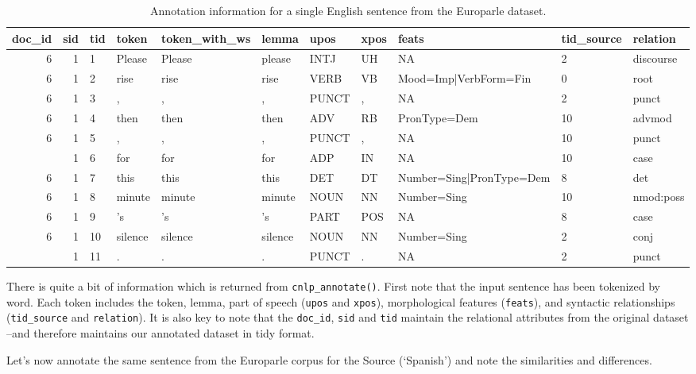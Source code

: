\documentclass[
  letterpaper,
]{latex/krantz}
\begin{document}
\hypertarget{tbl-td-generation-test-annotation-english}{}
\begin{table}
\caption{\label{tbl-td-generation-test-annotation-english}Annotation information for a single English sentence from the Europarle
dataset. }\tabularnewline

\centering
\begin{tabular}{rrlllllllll}
\toprule
doc\_id & sid & tid & token & token\_with\_ws & lemma & upos & xpos & feats & tid\_source & relation\\
\midrule
6 & 1 & 1 & Please & Please & please & INTJ & UH & NA & 2 & discourse\\
6 & 1 & 2 & rise & rise & rise & VERB & VB & Mood=Imp|VerbForm=Fin & 0 & root\\
6 & 1 & 3 & , & , & , & PUNCT & , & NA & 2 & punct\\
6 & 1 & 4 & then & then & then & ADV & RB & PronType=Dem & 10 & advmod\\
6 & 1 & 5 & , & , & , & PUNCT & , & NA & 10 & punct\\
\addlinespace
6 & 1 & 6 & for & for & for & ADP & IN & NA & 10 & case\\
6 & 1 & 7 & this & this & this & DET & DT & Number=Sing|PronType=Dem & 8 & det\\
6 & 1 & 8 & minute & minute & minute & NOUN & NN & Number=Sing & 10 & nmod:poss\\
6 & 1 & 9 & 's & 's & 's & PART & POS & NA & 8 & case\\
6 & 1 & 10 & silence & silence & silence & NOUN & NN & Number=Sing & 2 & conj\\
\addlinespace
6 & 1 & 11 & . & . & . & PUNCT & . & NA & 2 & punct\\
\bottomrule
\end{tabular}
\end{table}

There is quite a bit of information which is returned from
\texttt{cnlp\_annotate()}. First note that the input sentence has been
tokenized by word. Each token includes the token, lemma, part of speech
(\texttt{upos} and \texttt{xpos}), morphological features
(\texttt{feats}), and syntactic relationships (\texttt{tid\_source} and
\texttt{relation}). It is also key to note that the \texttt{doc\_id},
\texttt{sid} and \texttt{tid} maintain the relational attributes from
the original dataset --and therefore maintains our annotated dataset in
tidy format.

Let's now annotate the same sentence from the Europarle corpus for the
Source (`Spanish') and note the similarities and differences.
\end{document}
